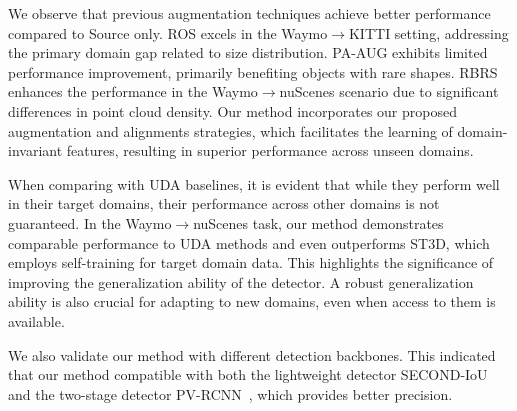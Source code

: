 We observe that previous augmentation techniques achieve better performance compared to Source only. ROS excels in the Waymo$\rightarrow$KITTI setting, addressing the primary domain gap related to size distribution. PA-AUG exhibits limited performance improvement, primarily benefiting objects with rare shapes. RBRS enhances the performance in the Waymo$\rightarrow$nuScenes scenario due to significant differences in point cloud density. Our method incorporates our proposed augmentation  and alignments strategies, which facilitates the learning of domain-invariant features, resulting in superior performance across unseen domains.

When comparing with UDA baselines, it is evident that while they perform well in their target domains, their performance across other domains is not guaranteed. In the Waymo$\rightarrow$nuScenes task, our method demonstrates comparable performance to UDA methods and even outperforms ST3D, which employs self-training for target domain data. This highlights the significance of improving the generalization ability of the detector. A robust generalization ability is also crucial for adapting to new domains, even when access to them is available.

We also validate our method with different detection backbones. This indicated that our method compatible with both the lightweight detector SECOND-IoU~\cite{yang2021st3d} and the two-stage detector PV-RCNN~\cite{shi2020pv}, which provides better precision.

